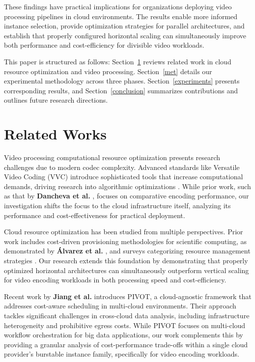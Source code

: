 \documentclass[conference]{IEEEtran}
\begin{document}
	These findings have practical implications for organizations deploying video processing pipelines in cloud environments. The results enable more informed instance selection, provide optimization strategies for parallel architectures, and establish that properly configured horizontal scaling can simultaneously improve both performance and cost-efficiency for divisible video workloads.
	
	This paper is structured as follows: Section~\ref{rel_works} reviews related work in cloud resource optimization and video processing. Section~\ref{met} details our experimental methodology across three phases. Section~\ref{experiments} presents corresponding results, and Section~\ref{conclusion} summarizes contributions and outlines future research directions.
	
	\section{Related Works}
	\label{rel_works}
	
	Video processing computational resource optimization presents research challenges due to modern codec complexity. Advanced standards like Versatile Video Coding (VVC) introduce sophisticated tools that increase computational demands, driving research into algorithmic optimizations \cite{b15, b16}. While prior work, such as that by \textbf{Dancheva et al.} \cite{b3}, focuses on comparative encoding performance, our investigation shifts the focus to the cloud infrastructure itself, analyzing its performance and cost-effectiveness for practical deployment.
	
	Cloud resource optimization has been studied from multiple perspectives. Prior work includes cost-driven provisioning methodologies for scientific computing, as demonstrated by \textbf{Álvarez et al.} \cite{b2}, and surveys categorizing resource management strategies \cite{b4}. Our research extends this foundation by demonstrating that properly optimized horizontal architectures can simultaneously outperform vertical scaling for video encoding workloads in both processing speed and cost-efficiency.
	
	Recent work by \textbf{Jiang et al.} \cite{b20} introduces PIVOT, a cloud-agnostic framework that addresses cost-aware scheduling in multi-cloud environments. Their approach tackles significant challenges in cross-cloud data analysis, including infrastructure heterogeneity and prohibitive egress costs. While PIVOT focuses on multi-cloud workflow orchestration for big data applications, our work complements this by providing a granular analysis of cost-performance trade-offs within a single cloud provider's burstable instance family, specifically for video encoding workloads.
	
\end{document}
